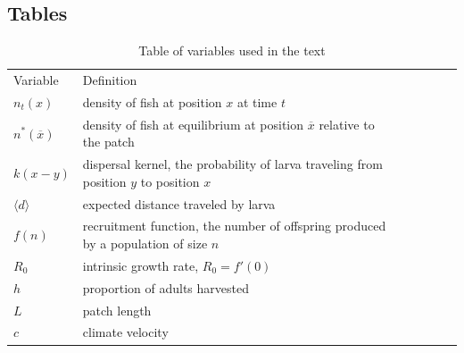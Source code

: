 \documentclass[12pt,english]{article}
\begin{document}
\begin{spacing}{1.9}
\section{Tables}
\begin{table}[h]
\caption{Table of variables used in the text}
\begin{tabular}{@{}lllllll@{}}
  Variable & Definition
\\\cmidrule{1-1} \cmidrule{2-2}   
$n_t(x)$ & density of fish at position $x$ at time $t$
\\ $n^*(\overline{x})$ & density of fish at equilibrium at position $\overline{x}$ relative to the patch 
\\ $k(x-y)$ & dispersal kernel, the probability of larva traveling from position $y$ to position $x$
\\ $\langle d \rangle $ & expected distance traveled by larva
\\ $f(n)$ & recruitment function, the number of offspring produced by a population of size $n$
\\ $R_0$ & intrinsic growth rate, $R_0=f'(0)$
\\ $h$ & proportion of adults harvested
\\ $L$ & patch length
\\ $c$ & climate velocity
\end{tabular}
\label{variables}
\end{table}

\pagebreak



\end{spacing}
\end{document}
